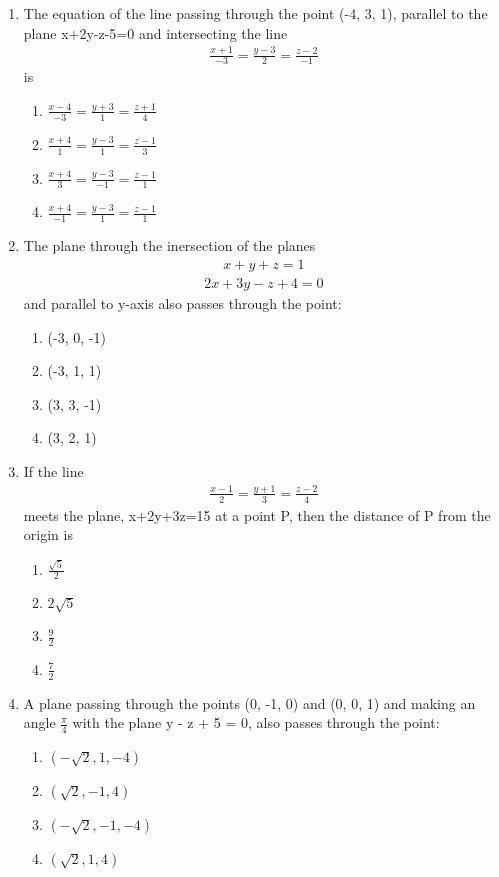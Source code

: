 \begin{enumerate}[label=\arabic*.,ref=\thesubsection.\theenumi]
\item The equation of the line passing through the point (-4, 3, 1), parallel to the plane x+2y-z-5=0 and intersecting the line 
\begin{align*}
\frac{x + 1}{-3} = \frac{y - 3}{2} = \frac{z - 2}{-1}
\end{align*}
is
\begin{enumerate}
\item $\frac{x-4}{-3} = \frac{y+3}{1} = \frac{z+1}{4}$
\item $\frac{x+4}{1} = \frac{y-3}{1} = \frac{z-1}{3}$
\item $\frac{x+4}{3} = \frac{y-3}{-1} = \frac{z-1}{1}$
\item $\frac{x+4}{-1} = \frac{y-3}{1} = \frac{z-1}{1}$
\end{enumerate}

\item The plane through the inersection of the planes 
\begin{align*}
x + y + z = 1 
\end{align*}
\begin{align*}
2x + 3y - z + 4 = 0
\end{align*}
and parallel to y-axis also passes through the point:
\begin{enumerate}
\item (-3, 0, -1)
\item (-3, 1, 1)
\item (3, 3, -1)
\item (3, 2, 1)
\end{enumerate}

\item If the line 
\begin{align*}
\frac{x-1}{2} = \frac{y+1}{3} = \frac{z-2}{4}
\end{align*}
meets the plane, x+2y+3z=15 at a point P, then the distance of P from the origin is
\begin{enumerate}
\item $\frac{\sqrt{5}}{2}$
\item $2\sqrt{5}$
\item $\frac{9}{2}$
\item $\frac{7}{2}$
\end{enumerate}

\item A plane passing through the points (0, -1, 0) and (0, 0, 1) and making an angle $\frac{\pi}{4}$ with the plane y - z + 5 = 0, also passes through the point:
\begin{enumerate}
\item $(-\sqrt{2}, 1, -4)$
\item $(\sqrt{2}, -1, 4)$
\item $(-\sqrt{2}, -1, -4)$
\item $(\sqrt{2}, 1, 4)$
\end{enumerate}


\end{enumerate}

